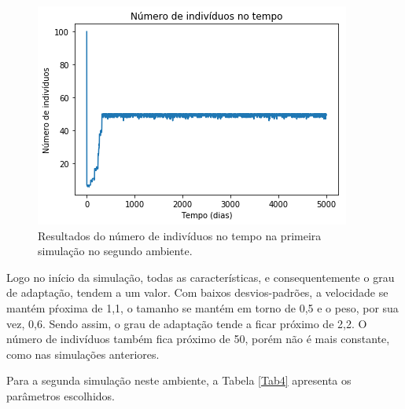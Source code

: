 \documentclass[10pt,brazil,english]{article}
\begin{document}
            \begin{figure}[!hbtp]
                \begin{center}
                    \includegraphics[scale=0.5]{Images/2-3.png}
                \end{center}
                \caption{Resultados do número de indivíduos no tempo na primeira simulação no segundo ambiente.}
                \label{Fig9}
            \end{figure}
            
            Logo no início da simulação, todas as características, e consequentemente o grau de adaptação, tendem a um valor. Com baixos desvios-padrões, a velocidade se mantém pŕoxima de 1,1, o tamanho se mantém em torno de 0,5 e o peso, por sua vez, 0,6. Sendo assim, o grau de adaptação tende a ficar próximo de 2,2. O número de indivíduos também fica próximo de 50, porém não é mais constante, como nas simulações anteriores.
            
            Para a segunda simulação neste ambiente, a Tabela \ref{Tab4} apresenta os parâmetros escolhidos.
            
\end{document}
